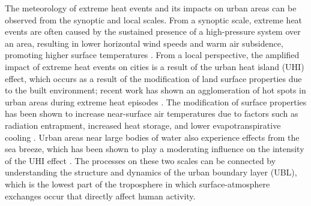 \documentclass[11pt,a4paper]{article}
\begin{document}
The meteorology of extreme heat events and its impacts on urban areas can be observed from the synoptic and local scales. From a synoptic scale, extreme heat events are often caused by the sustained presence of a high-pressure system over an area, resulting in lower horizontal wind speeds and warm air subsidence, promoting higher surface temperatures \citep{black2004, miralles2014}. From a local perspective, the amplified impact of extreme heat events on cities is a result of the urban heat island (UHI) effect, which occurs as a result of the modification of land surface properties due to the built environment; recent work has shown an agglomeration of hot spots in urban areas during extreme heat episodes \citep{shreevastava2021}. The modification of surface properties has been shown to increase near-surface air temperatures due to factors such as radiation entrapment, increased heat storage, and lower evapotranspirative cooling \citep{chen2014, li2013, ramamurthy2017a, zhao2018}. Urban areas near large bodies of water also experience effects from the sea breeze, which has been shown to play a moderating influence on the intensity of the UHI effect \citep{hu2016, jiang2019, stefanon2014}. The processes on these two scales can be connected by understanding the structure and dynamics of the urban boundary layer (UBL), which is the lowest part of the troposphere in which surface-atmosphere exchanges occur that directly affect human activity. 
\end{document}
